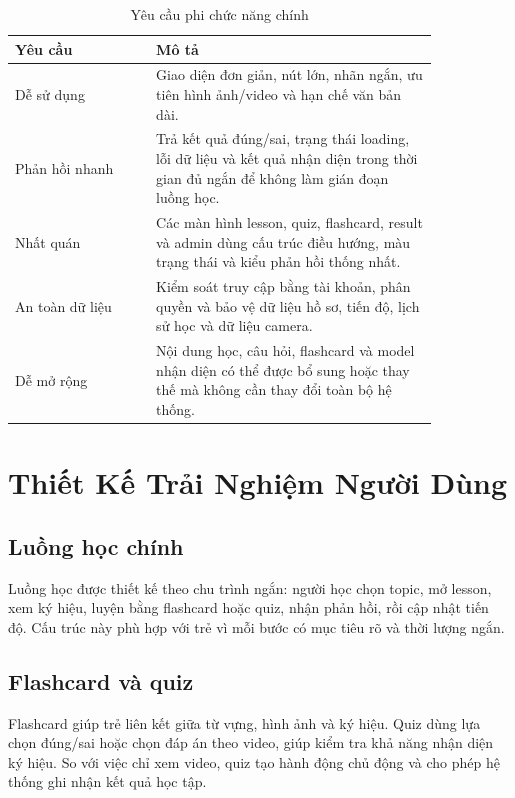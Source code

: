 \documentclass[conference]{IEEEtran}
\begin{document}
\begin{table}[htbp]
\caption{Yêu cầu phi chức năng chính}
\begin{center}
\footnotesize
\begin{tabular}{|p{0.28\linewidth}|p{0.56\linewidth}|}
\hline
\textbf{Yêu cầu} & \textbf{Mô tả} \\
\hline
Dễ sử dụng & Giao diện đơn giản, nút lớn, nhãn ngắn, ưu tiên hình ảnh/video và hạn chế văn bản dài. \\
\hline
Phản hồi nhanh & Trả kết quả đúng/sai, trạng thái loading, lỗi dữ liệu và kết quả nhận diện trong thời gian đủ ngắn để không làm gián đoạn luồng học. \\
\hline
Nhất quán & Các màn hình lesson, quiz, flashcard, result và admin dùng cấu trúc điều hướng, màu trạng thái và kiểu phản hồi thống nhất. \\
\hline
An toàn dữ liệu & Kiểm soát truy cập bằng tài khoản, phân quyền và bảo vệ dữ liệu hồ sơ, tiến độ, lịch sử học và dữ liệu camera. \\
\hline
Dễ mở rộng & Nội dung học, câu hỏi, flashcard và model nhận diện có thể được bổ sung hoặc thay thế mà không cần thay đổi toàn bộ hệ thống. \\
\hline
\end{tabular}
\label{tab:nonfunctional}
\end{center}
\end{table}

\section{Thiết Kế Trải Nghiệm Người Dùng}
\subsection{Luồng học chính}
Luồng học được thiết kế theo chu trình ngắn: người học chọn topic, mở lesson, xem ký hiệu, luyện bằng flashcard hoặc quiz, nhận phản hồi, rồi cập nhật tiến độ. Cấu trúc này phù hợp với trẻ vì mỗi bước có mục tiêu rõ và thời lượng ngắn.

\subsection{Flashcard và quiz}
Flashcard giúp trẻ liên kết giữa từ vựng, hình ảnh và ký hiệu. Quiz dùng lựa chọn đúng/sai hoặc chọn đáp án theo video, giúp kiểm tra khả năng nhận diện ký hiệu. So với việc chỉ xem video, quiz tạo hành động chủ động và cho phép hệ thống ghi nhận kết quả học tập.
\end{document}
